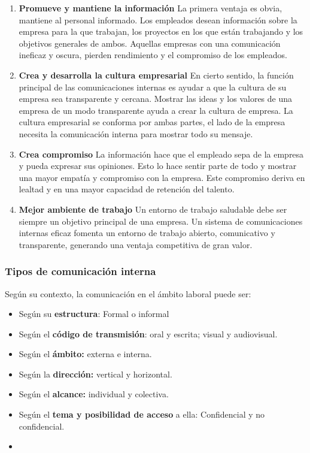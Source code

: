 \begin{enumerate}
    \item \textbf{Promueve y mantiene la información}
    La primera ventaja es obvia, mantiene al personal informado. Los empleados desean información sobre la empresa para la que trabajan, los proyectos en los que están trabajando y los objetivos generales de ambos.
    Aquellas empresas  con una comunicación ineficaz y oscura, pierden rendimiento y el compromiso de los empleados.
    
    \item \textbf{Crea y desarrolla la cultura empresarial}
    En cierto sentido, la función principal de las comunicaciones internas es ayudar a que la cultura de su empresa sea transparente y cercana.
    Mostrar las ideas y los valores de una empresa de un modo transparente ayuda a crear la cultura de empresa. La cultura empresarial se conforma por ambas partes, el lado de la empresa necesita la comunicación interna para mostrar todo su mensaje.
    
    \item \textbf{Crea compromiso}
    La información hace que el empleado sepa de la empresa  y pueda expresar sus opiniones. Esto lo hace sentir parte de  todo y mostrar una mayor empatía y compromiso con la empresa.
    Este compromiso deriva en lealtad y en una mayor capacidad de retención del talento.
    
    \item \textbf{Mejor ambiente de trabajo}
    Un entorno de trabajo saludable debe ser siempre un objetivo principal de una empresa. Un sistema de comunicaciones internas eficaz fomenta un entorno de trabajo abierto, comunicativo y transparente, generando una ventaja competitiva de gran valor.
\end{enumerate}

\subsubsection{Tipos de comunicación interna}
Según su contexto, la comunicación en el ámbito
laboral puede ser:

\begin{itemize}
    \item Según su \textbf{estructura}: Formal o informal
    \item Según el \textbf{código de transmisión}: oral y escrita; visual y audiovisual.
    \item Según el \textbf{ámbito:} externa e interna.
    \item Según la \textbf{dirección:} vertical y horizontal.
    \item Según el \textbf{alcance:} individual y colectiva.
    \item Según el \textbf{tema y posibilidad de acceso} a ella: Confidencial y no confidencial.
    \item 
\end{itemize}


